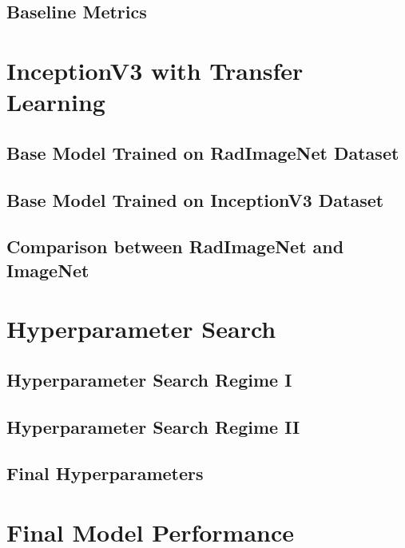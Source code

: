 



\subsection{Baseline Metrics}

\section{InceptionV3 with Transfer Learning}

\subsection{Base Model Trained on RadImageNet Dataset}



\subsection{Base Model Trained on InceptionV3 Dataset}



\subsection{Comparison between RadImageNet and ImageNet}

\section{Hyperparameter Search}

\subsection{Hyperparameter Search Regime I}









\subsection{Hyperparameter Search Regime II}





\subsection{Final Hyperparameters}

\section{Final Model Performance}

